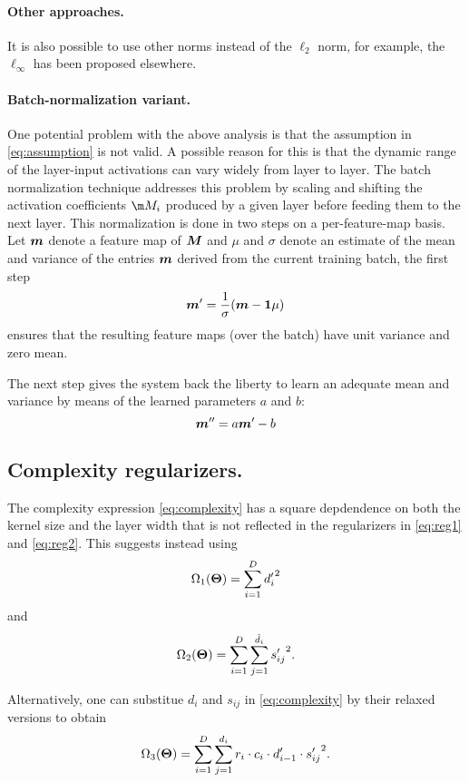 \paragraph{Other approaches.}
It is also possible to use other norms instead of the $\ell_2$ norm, for example, the $\ell_\infty$ has been proposed elsewhere.

\paragraph{Batch-normalization variant.}
One potential problem with the above analysis is that the assumption in \eqref{eq:assumption} is not valid. A possible reason for this is that the dynamic range of the layer-input activations can vary widely from layer to layer. The batch normalization technique \cite{} addresses this problem by scaling and shifting the activation coefficients $\m M_i$ produced by a given layer before feeding them to the next layer. This normalization is done in two steps on a per-feature-map basis. Let $\bm{m}$ denote a feature map of $\bm{M}$ and $\mu$ and $\sigma$ denote an estimate of the mean and variance of the entries $\bm{m}$ derived from the current training batch, the first step 
\begin{equation}
\bm{m}^\prime = \frac{1}{\sigma}( \bm{m} - \bm{1} \mu )
\end{equation}
ensures that the resulting feature maps (over the batch) have unit variance and zero mean.

The next step gives the system back the liberty to learn an adequate mean and variance by means of the learned parameters $a$ and $b$:
\begin{equation}
\bm{m}'' = a \bm{m}' - b
\end{equation}

\subsection{Complexity regularizers.}
The complexity expression \eqref{eq:complexity} has a square depdendence on both the kernel size and the layer width that is not reflected in the regularizers in \eqref{eq:reg1} and \eqref{eq:reg2}. This suggests instead using
\begin{equation}\label{eq:reg1 sq}
\Omega_1(\mm \Theta) = \sum_{i=1}^D  {\drlx_i}^2 %
\end{equation}
 and 
\begin{equation}\label{eq:reg2 sq}
  \Omega_2(\bm{\Theta}) = \sum_{i=1}^D\sum_{j=1}^{\hat{d}_i} {{s^\prime_{ij}}}^2.
\end{equation}

Alternatively, one can substitue $d_i$ and $s_{ij}$ in \eqref{eq:complexity} by their relaxed versions to obtain
\begin{equation}
  \Omega_3(\bm{\Theta}) = \sum_{i=1}^D \sum_{j=1}^{d_i} r_i \cdot c_i \cdot d^\prime_{i-1} \cdot {s^\prime_{ij}}^2.
\end{equation}


